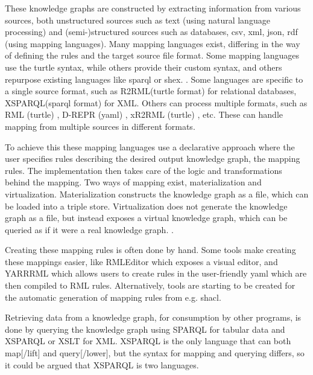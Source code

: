 These knowledge graphs are constructed by extracting information from various sources, both unstructured sources such as text (using natural language processing) and (semi-)structured sources such as databases, \acrshort{csv}, \acrshort{xml}, \acrshort{json}, \acrshort{rdf} (using mapping languages). Many mapping languages exist, differing in the way of defining the rules and the target source file format. Some mapping languages use the turtle syntax, while others provide their custom syntax, and others repurpose existing languages like \acrshort{sparql} or \acrshort{shex}. \citep{VANASSCHE2023100753}. Some languages are specific to a single source format, such as R2RML(turtle format) \citep{Das:12:RRR} for relational databases, XSPARQL(\acrshort{sparql} format) \citep{Bischof2012} for XML. Others can process multiple formats, such as RML (turtle) \citep{dimou_ldow_2014}, D-REPR (\acrshort{yaml}) \citep{d-repr}, xR2RML (turtle) \citep{xR2RML}, etc. These can handle mapping from multiple sources in different formats.

To achieve this these mapping languages use a declarative approach where the user specifies rules describing the desired output knowledge graph, the mapping rules. The implementation then takes care of the logic and transformations behind the mapping. Two ways of mapping exist, materialization and virtualization. Materialization constructs the knowledge graph as a file, which can be loaded into a triple store. Virtualization does not generate the knowledge graph as a file, but instead exposes a virtual knowledge graph, which can be queried as if it were a real knowledge graph. \citep{ontop}.

Creating these mapping rules is often done by hand. Some tools make creating these mappings easier, like RMLEditor \citep{heyvaert_jws_2018} which exposes a visual editor, and YARRRML \citep{10.1007/978-3-319-98192-5_40} which allows users to create rules in the user-friendly \acrshort{yaml} which are then compiled to RML rules. Alternatively, tools are starting to be created for the automatic generation of mapping rules from e.g. \acrshort{shacl}.

Retrieving data from a knowledge graph, for consumption by other programs, is done by querying the knowledge graph using SPARQL \citep{Seaborne:08:SQL} for tabular data and XSPARQL \citep{Bischof2012} or XSLT for XML. XSPARQL is the only language that can both map[/lift] and query[/lower], but the syntax for mapping and querying differs, so it could be argued that XSPARQL is two languages.


